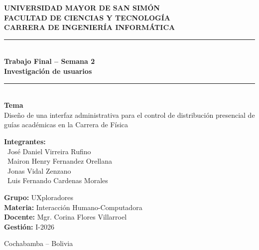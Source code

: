 \documentclass[12pt,letterpaper]{article}
\begin{document}
\begin{titlepage}
    \centering

    {\large \textbf{UNIVERSIDAD MAYOR DE SAN SIMÓN}}\\
    {\large \textbf{FACULTAD DE CIENCIAS Y TECNOLOGÍA}}\\
    {\large \textbf{CARRERA DE INGENIERÍA INFORMÁTICA}}\\[0.5cm]

    \rule{\textwidth}{0.5pt}\\[0.5cm]
    {\Large \textbf{Trabajo Final -- Semana 2}}\\[0.3cm]
    {\large \textbf{Investigación de usuarios}}\\[0.5cm]
    \rule{\textwidth}{0.5pt}\\[1cm]

    {\large \textbf{Tema}}\\[0.3cm]
    {\large Diseño de una interfaz administrativa para el control de distribución presencial de guías académicas en la Carrera de Física}\\[2cm]

    \begin{flushleft}
        \textbf{Integrantes:}\\
        \hspace*{0.5cm}\textbullet\ José Daniel Virreira Rufino\\
        \hspace*{0.5cm}\textbullet\ Mairon Henry Fernandez Orellana\\
        \hspace*{0.5cm}\textbullet\ Jonas Vidal Zenzano\\
        \hspace*{0.5cm}\textbullet\ Luis Fernando Cardenas Morales
    \end{flushleft}

    \begin{flushleft}
        \textbf{Grupo:} UXploradores\\
        \textbf{Materia:} Interacción Humano-Computadora\\
        \textbf{Docente:} Mgr. Corina Flores Villarroel\\
        \textbf{Gestión:} I-2026
    \end{flushleft}

    \vfill

    {\small Cochabamba -- Bolivia}\\
\end{titlepage}
\end{document}
